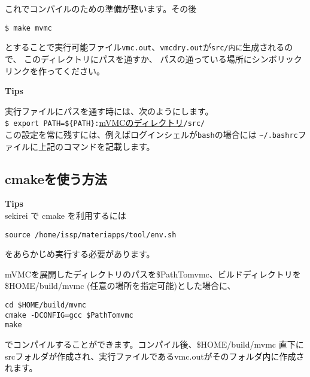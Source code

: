 これでコンパイルのための準備が整います。その後
\begin{verbatim}
$ make mvmc
\end{verbatim}

とすることで実行可能ファイル\verb|vmc.out|、\verb|vmcdry.out|が\verb|src/内に|生成されるので、
このディレクトリにパスを通すか、
パスの通っている場所にシンボリックリンクを作ってください。

\begin{screen}
\Large 
{\bf Tips}
\normalsize

実行ファイルにパスを通す時には、次のようにします。
\\
\verb|$ export PATH=${PATH}:|\underline{mVMCのディレクトリ}\verb|/src/|
\\
この設定を常に残すには、例えばログインシェルが\verb|bash|の場合には
\verb|~/.bashrc|ファイルに上記のコマンドを記載します。
\end{screen}

\subsection{cmakeを使う方法}

\begin{screen}
\Large 
{\bf Tips}
\normalsize\\
sekirei で cmake を利用するには
\begin{verbatim}
source /home/issp/materiapps/tool/env.sh
\end{verbatim}
をあらかじめ実行する必要があります。
\end{screen}

mVMCを展開したディレクトリのパスを\$PathTomvmc、ビルドディレクトリを\$HOME/build/mvmc (任意の場所を指定可能)とした場合に、
\begin{verbatim}
cd $HOME/build/mvmc
cmake -DCONFIG=gcc $PathTomvmc
make
\end{verbatim}
でコンパイルすることができます。コンパイル後、\$HOME/build/mvmc 直下にsrcフォルダが作成され、実行ファイルであるvmc.outがそのフォルダ内に作成されます。

